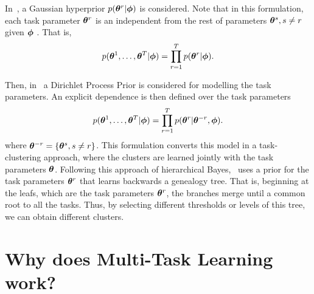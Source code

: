 In~\cite{YuTS05}, a Gaussian hyperprior $p(\bm{\theta}^r | \bm{\phi})$ is considered. Note that in this formulation, each task parameter $\bm{\theta}^r$ is an independent from the rest of parameters $\bm{\theta}^s, s \neq r$ given $\bm{\phi}$ .
That is,
\begin{equation}
    \nonumber
    p(\bm{\theta}^1, \ldots, \bm{\theta}^T | \bm{\phi}) = \prod_{r=1}^T p(\bm{\theta}^r | \bm{\phi}) .
\end{equation} 

%
Then, in~\cite{XueLCK07} a Dirichlet Process Prior is considered for modelling the task parameters. An explicit dependence is then defined over the task parameters
\begin{equation}
    \nonumber
    p(\bm{\theta}^1, \ldots, \bm{\theta}^T | \bm{\phi}) = \prod_{r=1}^T p(\bm{\theta}^r |\bm{\theta}^{-r} , \bm{\phi}) .
\end{equation} 
where $\bm{\theta}^{-r}  = \left\{\bm{\theta}^s, s \neq r \right\}$.
This formulation converts this model in a task-clustering approach, where the clusters are learned jointly with the task parameters $\bm{\theta}$.
Following this approach of hierarchical Bayes,~\cite{Daume09} uses a prior for the task parameters $\bm{\theta}^r$ that learns backwards a genealogy tree. That is, beginning at the leafs, which are the task parameters $\bm{\theta}^r$, the branches merge until a common root to all the tasks. Thus, by selecting different thresholds or levels of this tree, we can obtain different clusters.


\section{Why does Multi-Task Learning work?}
% 
